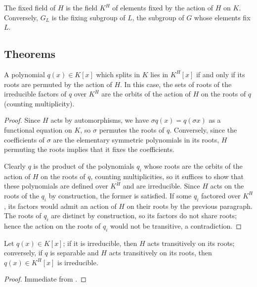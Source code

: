 \begin{definition} The fixed field of $H$ is the field $K^H$ of elements fixed by
the action of $H$ on $K$.  Conversely, $G_L$ is the fixing subgroup of $L$,
the subgroup of $G$ whose elements fix $L$.
\label{defn:fixing}
\end{definition}

\subsection{Theorems}

\begin{lemma} A polynomial $q(x) \in K[x]$ which splits in $K$ lies in
$K^H[x]$ if and only if its roots are permuted by the action of $H$.  In this
case, the sets of roots of the irreducible factors of $q$ over $K^H$ are the orbits
of the action of $H$ on the roots of $q$ (counting multiplicity).
\label{root_action}
\end{lemma}

\begin{proof} Since $H$ acts by automorphisms, we have $\sigma q(x) = q(\sigma
x)$ as a functional equation on $K$, so $\sigma$ permutes the roots of $q$.
Conversely, since the coefficients of $\sigma$ are the elementary symmetric
polynomials in its roots, $H$ permuting the roots implies that it fixes the
coefficients.

Clearly $q$ is the product of the polynomials $q_i$ whose roots are the orbits
of the action of $H$ on the roots of $q$, counting multiplicities, so it
suffices to show that these polynomials are defined over $K^H$ and are
irreducible.  Since $H$ acts on the roots of the $q_i$ by construction, the
former is satisfied.  If some $q_i$ factored over $K^H$, its factors would
admit an action of $H$ on their roots by the previous paragraph.  The roots of
$q_i$ are distinct by construction, so its factors do not share roots; hence
the action on the roots of $q_i$ would not be transitive, a contradiction.
\end{proof}

\begin{corollary} Let $q(x) \in K[x]$; if it is irreducible, then $H$ acts
transitively on its roots; conversely, if $q$ is separable and $H$ acts
transitively on its roots, then $q(x) \in K^H[x]$ is irreducible.
\label{sep_irred}
\end{corollary}

\begin{proof} Immediate from . \end{proof}

